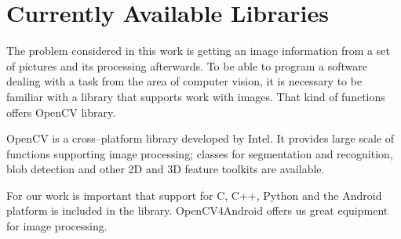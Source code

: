 \section{Currently Available Libraries}
The problem considered in this work is getting an image information from a set of pictures and its processing afterwards.
To be able to program a software dealing with a task from the area of computer vision, it is necessary to be familiar with a library that supports work with images. 
That kind of functions offers OpenCV library. 

OpenCV is a cross--platform library developed by Intel. It provides large scale of functions supporting image processing; classes for segmentation and recognition, blob detection and other 2D and 3D feature toolkits are available.

For our work is important that support for C, C++, Python and the Android platform is included in the library. 
OpenCV4Android offers us great equipment for image processing. 

















